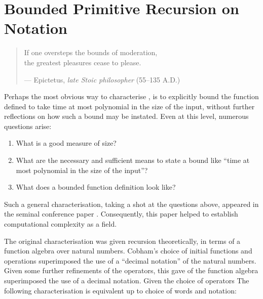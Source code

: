 \chapter{Bounded Primitive Recursion on Notation}

\begin{quotation}

\footnotesize\sffamily\itshape

\begin{flushright}

If one oversteps the bounds of moderation, \\
the greatest pleasures cease to please.

\smallbreak

\upshape

--- Epictetus, \emph{late Stoic philosopher} (55--135 A.D.)

\end{flushright}

\end{quotation}

Perhaps the most obvious way to characterise \FPTIME{}, is to explicitly bound
the function defined to take time at most polynomial in the size of the input,
without further reflections on how such a bound may be instated. Even at this
level, numerous questions arise:

\begin{enumerate}[label=(\arabic*)]

\item What is a good measure of size?

\item What are the necessary and sufficient means to state a bound like ``time
at most polynomial in the size of the input''?

\item What does a bounded function definition look like?

\end{enumerate}  

Such a general characterisation, taking a shot at the questions above, appeared
in the seminal conference paper \cite{cobham-1965}. Consequently, this paper
helped to establish computational complexity as a field\cite{clote-1999}.

The original characterisation was given recursion theoretically, in terms of a
function algebra over natural numbers. Cobham's choice of initial functions and
operations superimposed the use of a ``decimal notation'' of the natural
numbers. Given some further refinements of the operators, this gave   of the
function algebra superimposed the use of a decimal notation. Given the choice
of operators The following characterisation is equivalent up to choice of words
and notation:

